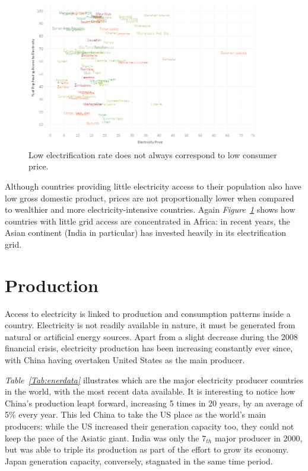 \documentclass[a4paper,12pt]{book}
\begin{document}
\begin{figure}[tb]
\begin{center}
\captionsetup{justification=centering}
\includegraphics[width=0.9\textwidth]{Images/accessNAMES.png}
\caption{Low electrification rate does not always correspond to low consumer price.}
\label{fig:northsouth}
\end{center}
\end{figure}

Although countries providing little electricity access to their population also have low gross domestic product, prices are not proportionally lower when compared to wealthier and more electricity-intensive countries. Again \textit{Figure~\ref{fig:northsouth}} shows how countries with little grid access are concentrated in Africa: in recent years, the Asian continent (India in particular) has invested heavily in its electrification grid.

\section{Production}

Access to electricity is linked to production and consumption patterns inside a country. Electricity is not readily available in nature, it must be generated from natural or artificial energy sources. Apart from a slight decrease during the 2008 financial crisis, electricity production has been increasing constantly ever since, with China having overtaken United States as the main producer.

\textit{Table~\ref{Tab:enerdata}} illustrates which are the major electricity producer countries in the world, with the most recent data available. It is interesting to notice how China's production leapt forward, increasing 5 times in 20 years, by an average of 5\% every year. This led China to take the US place as the world's main producers: while the US increased their generation capacity too, they could not keep the pace of the Asiatic giant. India was only the $7_{th}$ major producer in 2000, but was able to triple its production as part of the effort to grow its economy. Japan generation capacity, conversely, stagnated in the same time period.
\end{document}
